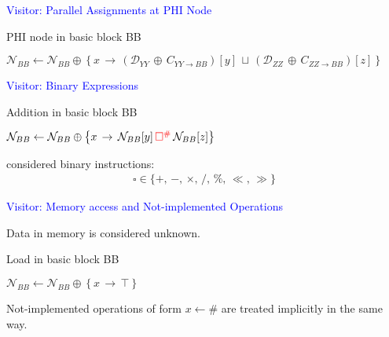 \begin{frame}[fragile]{\textcolor{blue}{Visitor: Parallel Assignments at PHI Node}}

\begin{algorithm}[H]
\caption{PHI node in basic block BB}
\begin{algorithmic}[1]
\State $\mathcal{N}_{BB}\gets\mathcal{N}_{BB}\oplus\left\lbrace x\,\rightarrow\, \left(\mathcal{D}_{YY} \,\oplus\,C_{YY\rightarrow BB} \right) [y] \,\sqcup\, \left(\mathcal{D}_{ZZ} \,\oplus\,C_{ZZ\rightarrow BB} \right)[z] \right\rbrace$
\EndProcedure
\end{algorithmic}
\end{algorithm}

\end{frame}


\begin{frame}[fragile]{\textcolor{blue}{Visitor: Binary Expressions}}

\begin{algorithm}[H]
\caption{Addition in basic block BB}
\begin{algorithmic}[1]
\State $\mathcal{N}_{BB}\gets\mathcal{N}_{BB}\oplus\left\lbrace x\,\rightarrow\, \mathcal{N}_{BB}[y]\,{\color{red}\square^\#}\, \mathcal{N}_{BB}[z] \right\rbrace$
\EndProcedure
\end{algorithmic}
\end{algorithm}
considered binary instructions:
\begin{align*}
\square \in \{ +,\,-,\,\times,\, /,\, \%,\, \ll,\, \gg \}
\end{align*}

\end{frame}


\begin{frame}[fragile]{\textcolor{blue}{Visitor: Memory access and Not-implemented Operations}}

Data in memory is considered unknown.
\begin{algorithm}[H]
\caption{Load in basic block BB}
\begin{algorithmic}[1]
\State $\mathcal{N}_{BB}\gets\mathcal{N}_{BB}\oplus\left\lbrace x\,\rightarrow\, \top \right\rbrace$
\EndProcedure
\end{algorithmic}
\end{algorithm}

\vspace{0.5cm}

\hfill Not-implemented operations of form $x\gets \#$ are treated {\color{blue}implicitly} in the same way.

\end{frame}